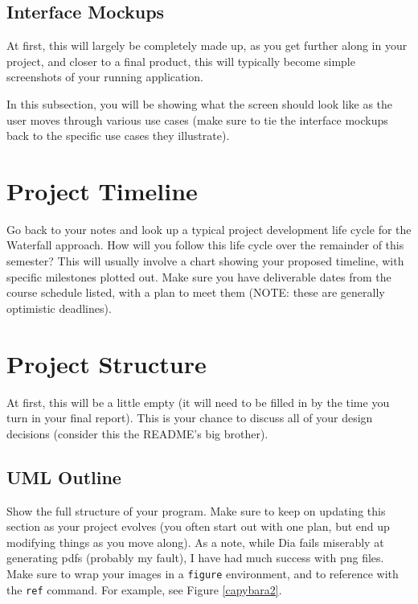 \documentclass[10pt,conference,onecolumn,compsoc]{IEEEtran}
\begin{document}
\subsection{Interface Mockups}
At first, this will largely be completely made up, as you get further along in your project, and closer to a final product, this will typically become simple screenshots of your running application.

In this subsection, you will be showing what the screen should look like as the user moves through various use cases (make sure to tie the interface mockups back to the specific use cases they illustrate).



\section{Project Timeline}
Go back to your notes and look up a typical project development life cycle for the Waterfall approach.  How will you follow this life cycle over the remainder of this semester?  This will usually involve a chart showing your proposed timeline, with specific milestones plotted out.  Make sure you have deliverable dates from the course schedule listed, with a plan to meet them (NOTE: these are generally optimistic deadlines).

\section{Project Structure}
At first, this will be a little empty (it will need to be filled in by the time you turn in your final report).  This is your chance to discuss all of your design decisions (consider this the README's big brother).

\subsection{UML Outline}
Show the full structure of your program.  Make sure to keep on updating this section as your project evolves (you often start out with one plan, but end up modifying things as you move along).  As a note, while Dia fails miserably at generating pdfs (probably my fault), I have had much success with png files.  Make sure to wrap your images in a \texttt{figure} environment, and to reference with the \texttt{ref} command.  For example, see Figure \ref{capybara2}.
\end{document}
